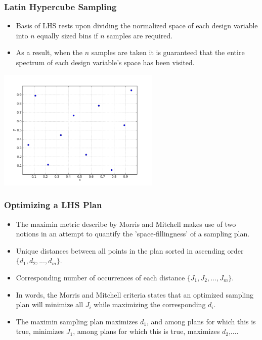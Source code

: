 \documentclass{beamer}
\begin{document}
\begin{frame}
\frametitle{Latin Hypercube Sampling}

\begin{itemize}
  \item Basis of LHS rests upon dividing the normalized space of each design variable into $n$ equally sized bins if $n$ samples are required. 
  \item As a result, when the $n$ samples are taken it is guaranteed that the entire
spectrum of each design variable's space has been visited.  
\end{itemize}
\centering
\includegraphics[width=0.58\textwidth]{./lhs.png}

\end{frame}
\begin{frame}
\frametitle{Optimizing a LHS Plan}

\begin{itemize}
  \item The maximin metric describe by Morris and Mitchell makes use of two notions in an attempt to quantify the 'space-fillingness' of a sampling plan. 
  \item Unique distances between all points in the plan sorted in ascending order $\lbrace d_1, d_2, ..., d_m\rbrace$.
  \item Corresponding number of occurrences of each distance $\lbrace J_1, J_2, ..., J_m\rbrace$.  
  \item In words, the Morris and Mitchell criteria states that an optimized sampling plan will minimize all $J_i$ while maximizing the corresponding $d_i$. 
  \item The maximin sampling plan maximizes $d_1$, and among plans for which this is true, minimizes $J_1$, among plans for which this is true, maximizes $d_2$,....
\end{itemize}

\end{frame}
\end{document}
